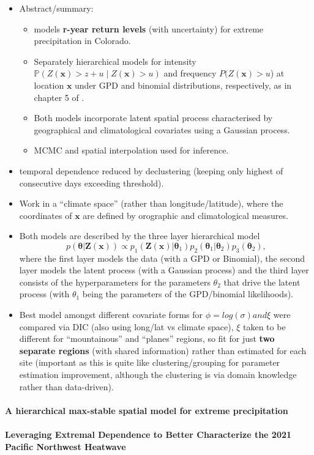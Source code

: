 \documentclass{article}
\numberwithin{equation}{section}
\begin{document}
\begin{itemize}
  \item Abstract/summary:
    \begin{itemize}
      \item \cite{Cooley2007} models \textbf{r-year return levels} (with uncertainty) for extreme precipitation in Colorado.
      \item Separately hierarchical models for intensity $\mathbb{P}(Z(\bm{x}) > z + u \mid Z(\bm{x}) > u)$ and frequency $P(Z(\bm{x}) > u$) at location $\bm{x}$ under GPD and binomial distributions, respectively, as in chapter 5 of \cite{Coles2001}. 
      \item Both models incorporate latent spatial process characterised by geographical and climatological covariates using a Gaussian process. 
      \item MCMC and spatial interpolation used for inference. 
    \end{itemize}
    \item temporal dependence reduced by declustering (keeping only highest of consecutive days exceeding threshold). 
    \item Work in a ``climate space'' (rather than longitude/latitude), where the coordinates of $\bm{x}$ are defined by orographic and climatological measures. 
    \item Both models are described by the three layer hierarchical model
      \[
        p(\bm{\theta} | \bm{Z}(\bm{x})) \propto p_1(\bm{Z}(\bm{x}) | \bm{\theta}_1) p_2(\bm{\theta}_1 | \bm{\theta}_2) p_3(\bm{\theta}_2),
      \]
      where the first layer models the data (with a GPD or Binomial), the second layer models the latent process (with a Gaussian process) and the third layer consists of the hyperparameters for the parameters $\theta_2$ that drive the latent process (with $\theta_1$ being the parameters of the GPD/binomial likelihoods). 
    \item Best model amongst different covariate forms for $\phi = log(\sigma) and \xi$ were compared via DIC (also using long/lat vs climate space), $\xi$ taken to be different for ``mountainous'' and ``planes'' regions, so fit for just \textbf{two separate regions} (with shared information) rather than estimated for each site (important as this is quite like clustering/grouping for parameter estimation improvement, although the clustering is via domain knowledge rather than data-driven). 
\end{itemize}

\paragraph{A hierarchical max-stable spatial model for extreme precipitation}

\paragraph{Leveraging Extremal Dependence to Better Characterize the 2021 Pacific Northwest Heatwave}



\end{document}
